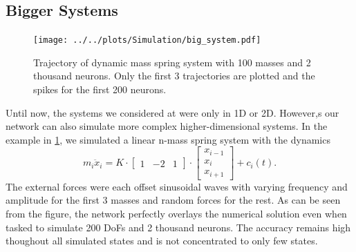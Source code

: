 \subsection{Bigger Systems}
\begin{figure}[h!]
	\centering
		\texttt{[image: ../../plots/Simulation/big\_system.pdf]}
	\caption{Trajectory of dynamic mass spring system with 100 masses and 2 thousand neurons. Only the first 3 trajectories are plotted and the spikes for the first 200 neurons.	}
	\label{fig:big_systems}
\end{figure}

Until now, the systems we considered at were only in 1D or 2D. However,s our network can also simulate more complex higher-dimensional systems.
In the example in \cref{fig:big_systems}, we simulated a linear n-mass spring system with the dynamics
\begin{equation}
	m_i\ddot{x}_i = K\cdot \begin{bmatrix}
	1&-2&1
	\end{bmatrix} \cdot	\begin{bmatrix}
	x_{i-1}\\
	x_i\\
	x_{i+1}
	\end{bmatrix} + c_i(t).
\end{equation}
The external forces were each offset sinusoidal waves with varying frequency and amplitude for the first 3 masses and random forces for the rest. As can be seen from the figure, the network perfectly overlays the numerical solution even when tasked to simulate 200 DoFs and 2 thousand neurons. The accuracy remains high thoughout all simulated states and is not concentrated to only few states.


